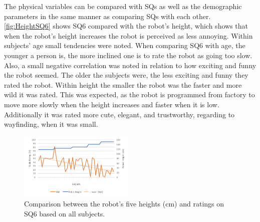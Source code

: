 The physical variables can be compared with SQs as well as the demographic parameters in the same manner as comparing SQs with each other. \autoref{fig:HeightSQ6} shows SQ6 compared with the robot's height, which shows that when the robot's height increases the robot is perceived as less annoying. Within subjects' age small tendencies were noted. When comparing SQ6 with age, the younger a person is, the more inclined one is to rate the robot as going too slow. Also, a small negative correlation was noted in relation to how exciting and funny the robot seemed. The older the subjects were, the less exciting and funny they rated the robot. Within height the smaller the robot was the faster and more wild it was rated. This was expected, as the robot is programmed from factory to move more slowly when the height increases and faster when it is low. Additionally it was rated more cute, elegant, and trustworthy, regarding to wayfinding, when it was small.
%
\begin{figure}[H]
	\centering
	\includegraphics[width = 0.49\textwidth]{Figure/HeightSQ6}
	\setlength{} 
	\caption{Comparison between the robot's five heights (cm) and ratings on SQ6 based on all subjects.}
	\label{fig:HeightSQ6}
\end{figure}
\noindent
%
